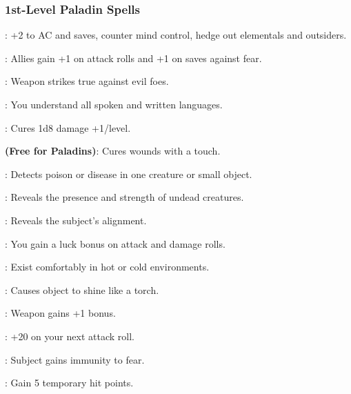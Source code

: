 \subsubsection{1st-Level Paladin Spells}
\begin{list}{}{\leftmargin=1em}
\item {}: +2 to AC and saves, counter mind control, hedge out elementals and outsiders.
\item {}: Allies gain +1 on attack rolls and +1 on saves against fear.
\item {}: Weapon strikes true against evil foes.
\item {}: You understand all spoken and written languages.
\item {}: Cures 1d8 damage +1/level.
\item {} \textbf{(Free for Paladins)}: Cures wounds with a touch.
\item {}: Detects poison or disease in one creature or small object.
\item {}: Reveals the presence and strength of undead creatures.
\item {}: Reveals the subject's alignment.
\item {}: You gain a luck bonus on attack and damage rolls.
\item {}: Exist comfortably in hot or cold environments.
\item {}: Causes object to shine like a torch.
\item {}: Weapon gains +1 bonus.
\item {}: +20 on your next attack roll.
\item {}: Subject gains immunity to fear.
\item {}: Gain 5 temporary hit points.
\end{list}
